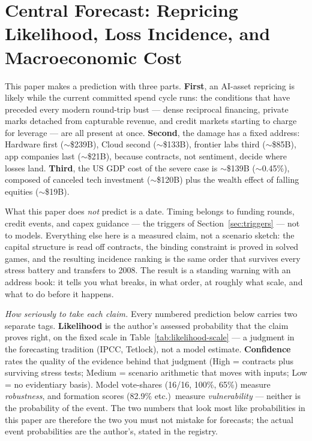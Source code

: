 \documentclass[11pt,a4paper]{article}
\begin{document}
\section{Central Forecast: Repricing Likelihood, Loss Incidence, and Macroeconomic Cost}\label{sec:prediction}
This paper makes a prediction with three parts. \textbf{First}, an AI-asset
repricing is likely while the current committed spend cycle runs: the
conditions that have preceded every modern round-trip bust --- dense
reciprocal financing, private marks detached from capturable revenue, and
credit markets starting to charge for leverage --- are all present at once.
\textbf{Second}, the damage has a fixed address: Hardware first
($\sim$\$239B), Cloud second ($\sim$\$133B), frontier labs third
($\sim$\$85B), app companies last ($\sim$\$21B), because contracts, not
sentiment, decide where losses land. \textbf{Third}, the US GDP cost of the
severe case is $\sim$\$139B ($\sim$0.45\%), composed of canceled tech
investment ($\sim$\$120B) plus the wealth effect of falling equities
($\sim$\$19B).

What this paper does \emph{not} predict is a date. Timing belongs to funding
rounds, credit events, and capex guidance --- the triggers of Section~\ref{sec:triggers} ---
not to models. Everything else here is a measured claim, not a scenario
sketch: the capital structure is read off contracts, the binding constraint
is proved in solved games, and the resulting incidence ranking is the same
order that survives every stress battery and transfers to 2008. The result
is a standing warning with an address book: it tells you what breaks, in
what order, at roughly what scale, and what to do before it happens.

\emph{How seriously to take each claim.} Every numbered prediction below
carries two separate tags. \textbf{Likelihood} is the author's assessed
probability that the claim proves right, on the fixed scale in
Table~\ref{tab:likelihood-scale} --- a judgment in the forecasting tradition
(IPCC, Tetlock), not a model estimate. \textbf{Confidence} rates the quality
of the evidence behind that judgment (High = contracts plus surviving stress
tests; Medium = scenario arithmetic that moves with inputs; Low = no
evidentiary basis). Model vote-shares (16/16, 100\%, 65\%) measure
\emph{robustness}, and formation scores (82.9\% etc.)\ measure
\emph{vulnerability} --- neither is the probability of the event. The two
numbers that look most like probabilities in this paper are therefore the
two you must not mistake for forecasts; the actual event probabilities are
the author's, stated in the registry.
\end{document}

